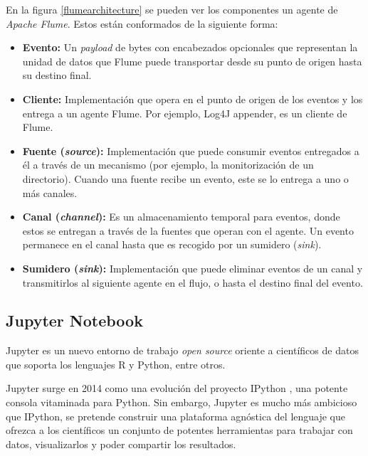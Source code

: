 En la figura \ref{flumearchitecture} se pueden ver los componentes un agente de \textit{Apache Flume}. Estos están conformados de la siguiente forma:

\begin{itemize}
	\item \textbf{Evento:} Un \textit{payload} \cite{payload} de bytes con encabezados opcionales que representan la unidad de datos que Flume puede transportar desde su punto de origen hasta su destino final.
	
	\item \textbf{Cliente:} Implementación que opera en el punto de origen de los eventos y los entrega a un agente Flume. Por ejemplo, Log4J appender, es un cliente de Flume.
	
	\item \textbf{Fuente (\textit{source}):} Implementación que puede consumir eventos entregados a él a través de un mecanismo (por ejemplo, la monitorización de un directorio). Cuando una fuente recibe un evento, este se lo entrega a uno o más canales.
	
	\item \textbf{Canal (\textit{channel}):} Es un almacenamiento temporal para eventos, donde estos se entregan a través de la fuentes que operan con el agente. Un evento permanece en el canal hasta que es recogido por un sumidero (\textit{sink}).
	
	\item \textbf{Sumidero (\textit{sink}):} Implementación que puede eliminar eventos de un canal y transmitirlos al siguiente agente en el flujo, o hasta el destino final del evento.
\end{itemize} 

\clearpage
\subsection{Jupyter Notebook \label{jupyterEA}}
Jupyter \cite{jupyter} es un nuevo entorno de trabajo \textit{open source} oriente a científicos de datos que soporta los lenguajes R y Python, entre otros.

Jupyter surge en 2014 como una evolución del proyecto IPython \cite{iptyhon}, una potente consola vitaminada para Python. Sin embargo, Jupyter es mucho más ambicioso que IPython, se pretende construir una plataforma agnóstica del lenguaje que ofrezca a los científicos un conjunto de potentes herramientas para trabajar con datos, visualizarlos y poder compartir los resultados.


